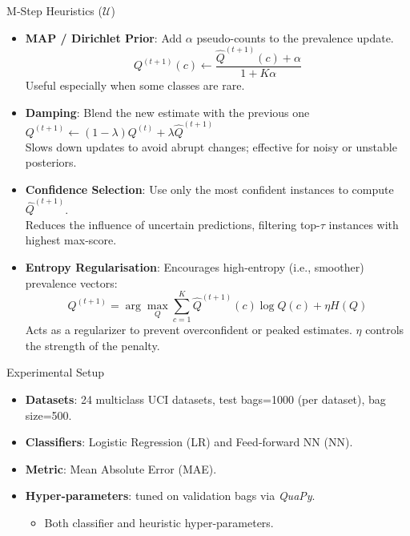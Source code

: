 \documentclass[aspectratio=169]{beamer}
\begin{document}
\begin{frame}{M‑Step Heuristics ($\mathcal{U}$)}
  \begin{itemize}
    \item \textbf{MAP / Dirichlet Prior}: Add $\alpha$ pseudo-counts to the prevalence update.\\
    \[
    Q^{(t+1)}(c) \gets \frac{\hat{Q}^{(t+1)}(c) + \alpha}{1 + K\alpha}
    \]
    Useful especially when some classes are rare.
    \normalsize

    \item \textbf{Damping}: Blend the new estimate with the previous one $Q^{(t+1)} \gets (1-\lambda) Q^{(t)} + \lambda \hat{Q}^{(t+1)}$   \\
    
    \small Slows down updates to avoid abrupt changes; effective for noisy or unstable posteriors.
    \normalsize

    \item \textbf{Confidence Selection}: Use only the most confident instances to compute $\hat{Q}^{(t+1)}$.\\
    \small Reduces the influence of uncertain predictions, filtering top-$\tau$ instances with highest max-score.
    \normalsize

    \item \textbf{Entropy Regularisation}: Encourages high-entropy (i.e., smoother) prevalence vectors:\\
    \[
        Q^{(t+1)} = \arg\max_Q \sum_{c=1}^K \hat{Q}^{(t+1)}(c) \log Q(c) + \eta H(Q)
    \]
    \small Acts as a regularizer to prevent overconfident or peaked estimates. $\eta$ controls the strength of the penalty.
  \end{itemize}
\end{frame}


\begin{frame}{Experimental Setup}
  \begin{itemize}
    \item \textbf{Datasets}: 24 multiclass UCI datasets, test bags=1000 (per dataset), bag size=500.
    \item \textbf{Classifiers}: Logistic Regression (LR) and Feed‑forward NN (NN).
    \item \textbf{Metric}: Mean Absolute Error (MAE).
    \item \textbf{Hyper‑parameters}: tuned on validation bags via \textit{QuaPy}.
    \begin{itemize}
        \item Both classifier and heuristic hyper‑parameters.
    \end{itemize}
  \end{itemize}
\end{frame}
\end{document}
